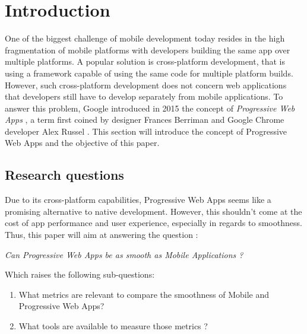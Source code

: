

\chapter{Introduction}

One of the biggest challenge of mobile development today resides in the high fragmentation of mobile platforms \cite{MobileDevChallenges} with developers building the same app over multiple platforms. A popular solution is cross-platform development, that is using a framework capable of using the same code for multiple platform builds. However, such cross-platform development does not concern web applications that developers still have to develop separately from mobile applications. To answer this problem, Google introduced in 2015 the concept of \textit{Progressive Web Apps} \cite{PWA_intro}, a term first coined by designer Frances Berriman and Google Chrome  developer Alex Russel \cite{PWA_blog} \cite{PWApossibleUnifer}.
This section will introduce the concept of Progressive Web Apps and the objective of this paper.


\section{Research questions}

Due to its cross-platform capabilities, Progressive Web Apps seems like a promising alternative to native development. However, this shouldn't come at the cost of app performance and user experience, especially in regards to smoothness.
Thus, this paper will aim at answering the question : 
\begin{center}
    \textit{Can Progressive Web Apps be as smooth as Mobile Applications ?}
\end{center}
Which raises the following sub-questions: 
\begin{enumerate}
    \item What metrics are relevant to compare the smoothness of Mobile and Progressive Web Apps?
    \item What tools are available to measure those metrics ?
\end{enumerate}

\iffalse
Due to its cross-platform capabilities, Progressive Web Apps seems like a promising alternative to native development. However, this shouldn't come at the cost of app performance and user experience, especially in regards to smoothness.
Thus, this paper will aim at answering the question : 
\begin{center}
    \textit{Are Progressive Web Apps as performant as Mobile Applications in terms of smoothness?}
\end{center}
Which can be divided into the sub-questions: 
\begin{enumerate}
    \item How can we compare the smoothness of Progressive Web Apps and Mobile Applications ?
    \item With the metrics identified previously, are Progressive Web Apps as smooth as Mobile Applications ?
    \item How many resources are used to render a smooth application ?
\end{enumerate}
\fi


